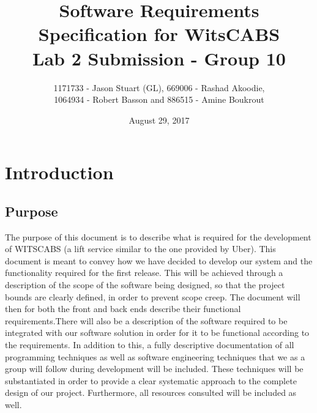 \documentclass[a4paper,12pt]{article}
\begin{document}
\title{Software Requirements Specification for WitsCABS\\Lab 2 Submission - Group 10}\author{1171733 - Jason Stuart (GL), 669006 - Rashad Akoodie, \\1064934 - Robert Basson and 886515 - Amine Boukrout}
\date{August 29, 2017}
\maketitle
\newpage
\tableofcontents
\newpage

\section{Introduction}
\subsection{Purpose}
The purpose of this document is to describe what is required for the development of WITSCABS (a lift service similar to the one provided by Uber). This document is meant to convey how we have decided to develop our system and the functionality required for the first release. This will be achieved through a description of the scope of the software being designed, so that the project bounds are clearly defined, in order to prevent scope creep. The document will then for both the front and back ends describe their functional requirements.There will also be a description of the software required to be integrated with our software solution in order for it to be functional according to the requirements.
In addition to this, a fully descriptive documentation of all programming techniques as well as software engineering techniques that we as a group will follow during development will be included. These techniques will be substantiated in order to provide a clear systematic approach to the complete design of our project. Furthermore, all resources consulted will be included as well.
\end{document}
